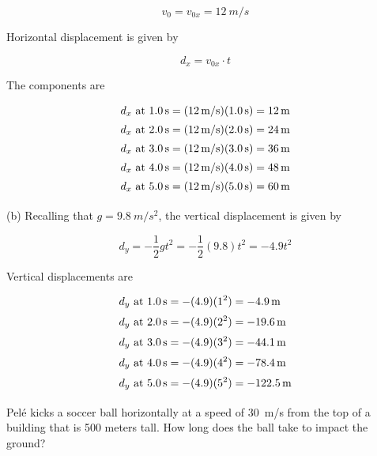 \documentclass{article}
\begin{document}
\begin{equation*}
    v_0 = v_{0x} = \SI{12}{m/s}
\end{equation*}

Horizontal displacement is given by

\begin{equation*}
    d_x = v_{0x} \cdot t
\end{equation*}

The components are

\begin{align*}
    d_x \text{ at \SI{1.0}{s}} &= (\SI{12}{m/s})(\SI{1.0}{s}) = \SI{12}{m}\\[0.5ex]
    d_x \text{ at \SI{2.0}{s}} &= (\SI{12}{m/s})(\SI{2.0}{s}) = \SI{24}{m}\\[0.5ex]
    d_x \text{ at \SI{3.0}{s}} &= (\SI{12}{m/s})(\SI{3.0}{s}) = \SI{36}{m}\\[0.5ex]
    d_x \text{ at \SI{4.0}{s}} &= (\SI{12}{m/s})(\SI{4.0}{s}) = \SI{48}{m}\\[0.5ex]
    d_x \text{ at \SI{5.0}{s}} &= (\SI{12}{m/s})(\SI{5.0}{s}) = \SI{60}{m}\\[0.5ex]
\end{align*}

(b) Recalling that $g=\SI{9.8}{m/s^2}$,  the vertical displacement is given by

\begin{equation*}
    d_y = -\frac{1}{2} g t^2 = -\frac{1}{2}(9.8) t^2 = -4.9 t^2
\end{equation*}

Vertical displacements are
\vspace{-2em}

\begin{align*}
    d_y \text{ at \SI{1.0}{s}} &= -(4.9)(1^2) = -\SI{4.9}{m}\\[0.5ex]
    d_y \text{ at \SI{2.0}{s}} &= -(4.9)(2^2) = -\SI{19.6}{m}\\[0.5ex]
    d_y \text{ at \SI{3.0}{s}} &= -(4.9)(3^2) = -\SI{44.1}{m}\\[0.5ex]
    d_y \text{ at \SI{4.0}{s}} &= -(4.9)(4^2) = -\SI{78.4}{m}\\[0.5ex]
    d_y \text{ at \SI{5.0}{s}} &= -(4.9)(5^2) = -\SI{122.5}{m}\\[0.5ex]
\end{align*}
\vspace{-1em}

\begin{example} \label{i3PZ3N}
    Pel\'{e} kicks a soccer ball horizontally at a speed of \SI{30}{m/s} from the top of a building that is 500 meters tall. How long does the ball take to impact the ground?
\end{example}
\end{document}
